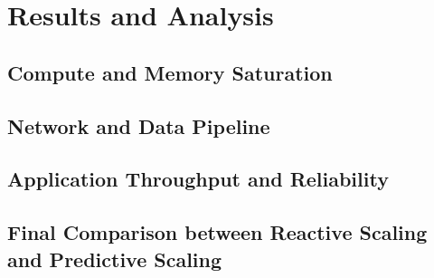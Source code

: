\newpage
\section{Results and Analysis}
\label{sec:results-and-analysis}

\subsection{Compute and Memory Saturation}
\label{subsec:compute-memory}

\subsection{Network and Data Pipeline}
\label{subsec:network-data-pipeline}

\subsection{Application Throughput and Reliability}
\label{subsec:application-throughput-reliability}

\subsection{Final Comparison between Reactive Scaling and Predictive Scaling}
\label{subsec:final-comparison}
